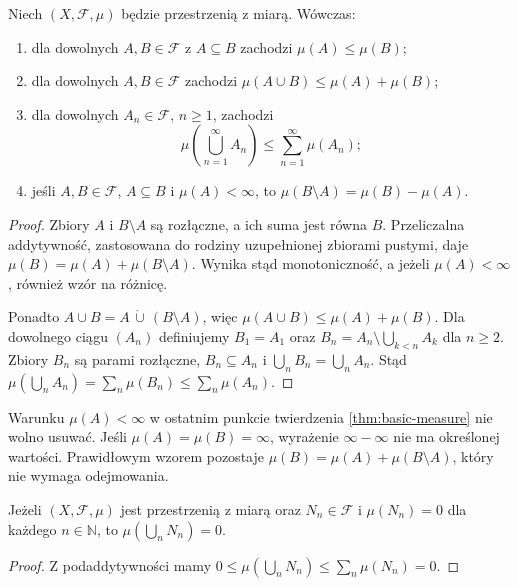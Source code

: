 \begin{twierdzenie}
\label{thm:basic-measure}
Niech $(X,\mathcal F,\mu)$ będzie przestrzenią z miarą.
Wówczas:
\begin{enumerate}
\item dla dowolnych $A,B\in\mathcal F$ z $A\subseteq B$ zachodzi
$\mu(A)\leq\mu(B)$;
\item dla dowolnych $A,B\in\mathcal F$ zachodzi
$\mu(A\cup B)\leq\mu(A)+\mu(B)$;
\item dla dowolnych $A_n\in\mathcal F$, $n\geq1$, zachodzi
\begin{equation}
\label{eq:subadditivity}
\mu\left(\bigcup_{n=1}^{\infty}A_n\right)
\leq\sum_{n=1}^{\infty}\mu(A_n);
\end{equation}
\item jeśli $A,B\in\mathcal F$, $A\subseteq B$ i $\mu(A)<\infty$,
to $\mu(B\setminus A)=\mu(B)-\mu(A)$.
\end{enumerate}
\end{twierdzenie}
\begin{proof}
Zbiory $A$ i $B\setminus A$ są rozłączne, a ich suma jest równa $B$.
Przeliczalna addytywność, zastosowana do rodziny uzupełnionej
zbiorami pustymi, daje
$\mu(B)=\mu(A)+\mu(B\setminus A)$. Wynika stąd monotoniczność,
a jeżeli $\mu(A)<\infty$, również wzór na różnicę.

Ponadto $A\cup B=A\,\dot\cup\,(B\setminus A)$, więc
$\mu(A\cup B)\leq\mu(A)+\mu(B)$.
Dla dowolnego ciągu $(A_n)$ definiujemy
$B_1=A_1$ oraz
$B_n=A_n\setminus\bigcup_{k<n}A_k$ dla $n\geq2$.
Zbiory $B_n$ są parami rozłączne, $B_n\subseteq A_n$
i $\bigcup_nB_n=\bigcup_nA_n$. Stąd
$\mu(\bigcup_nA_n)=\sum_n\mu(B_n)\leq\sum_n\mu(A_n)$.
\end{proof}

\begin{uwaga}
Warunku $\mu(A)<\infty$ w ostatnim punkcie twierdzenia
\ref{thm:basic-measure} nie wolno usuwać. Jeśli
$\mu(A)=\mu(B)=\infty$, wyrażenie $\infty-\infty$
nie ma określonej wartości. Prawidłowym wzorem pozostaje
$\mu(B)=\mu(A)+\mu(B\setminus A)$, który nie wymaga odejmowania.
\end{uwaga}

\begin{wniosek}
\label{cor:null-union}
Jeżeli $(X,\mathcal F,\mu)$ jest przestrzenią z miarą oraz
$N_n\in\mathcal F$ i $\mu(N_n)=0$ dla każdego $n\in\mathbb N$,
to $\mu(\bigcup_nN_n)=0$.
\end{wniosek}
\begin{proof}
Z podaddytywności mamy
$0\leq\mu(\bigcup_nN_n)\leq\sum_n\mu(N_n)=0$.
\end{proof}

